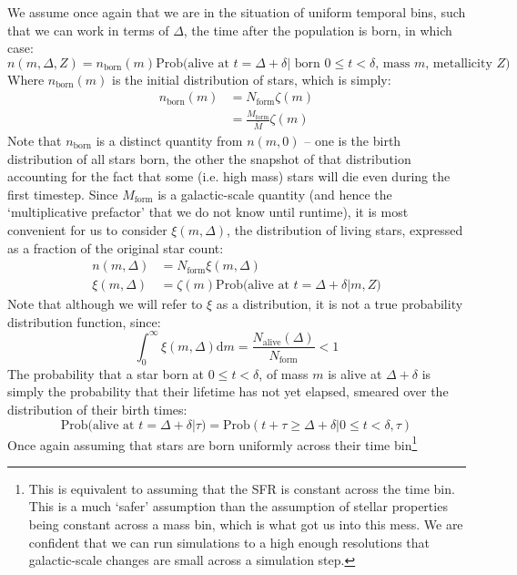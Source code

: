 \documentclass[a4paper,11pt]{article}
\def\d{\mathrm d}
\begin{document}
		We assume once again that we are in the situation of uniform temporal bins, such that we can work in terms of $\Delta$, the time after the population is born, in which case:
		\begin{equation}
			n(m,\Delta,Z) = n_\text{born}(m) \text{Prob(alive at $t=\Delta + \delta |$ born $0\leq t < \delta$, mass $m$, metallicity $Z$)}
		\end{equation}
		Where $n_\text{born}(m)$ is the initial distribution of stars, which is simply:
		\begin{align}
			n_\text{born}(m) &= N_\text{form} \zeta(m)
			\\ 
			& = \frac{M_\text{form}}{\bar{M}} \zeta(m)
		\end{align} 
		Note that $n_\text{born}$ is a distinct quantity from $n(m,0)$ -- one is the birth distribution of all stars born, the other the snapshot of that distribution accounting for the fact that some (i.e. high mass) stars will die even during the first timestep. Since $M_\text{form}$ is a galactic-scale quantity (and hence the `multiplicative prefactor' that we do not know until runtime), it is most convenient for us to consider $\xi(m,\Delta)$, the distribution of living stars, expressed as a fraction of the original star count:
		\begin{align}
			n(m,\Delta) & = N_\text{form} \xi(m,\Delta) 
			\\
			\xi(m,\Delta) &= \zeta(m)\text{Prob(alive at $t=\Delta + \delta |m, Z$)}
		\end{align}
		Note that although we will refer to $\xi$ as a distribution, it is not a true probability distribution function, since:
		\begin{equation}
			\int_0^\infty \xi(m,\Delta) \d m = \frac{N_\text{alive}(\Delta)}{N_\text{form}} < 1
		\end{equation}
		The probability that a star born at $0 \leq t < \delta$, of mass $m$ is alive at $\Delta + \delta$ is simply the probability that their lifetime has not yet elapsed, smeared over the distribution of their birth times:
		\begin{equation}
			\text{Prob(alive at $t=\Delta + \delta |\tau$)} = \text{Prob}\left(t + \tau \geq \Delta + \delta | 0 \leq t < \delta, \tau\right)
		\end{equation}
		Once again assuming that stars are born uniformly across their time bin\footnote{This is equivalent to assuming that the SFR is constant across the time bin. This is a much `safer' assumption than the assumption of stellar properties being constant across a mass bin, which is what got us into this mess. We are confident that we can run simulations to a high enough resolutions that galactic-scale changes are small across a simulation step.}
\end{document}
